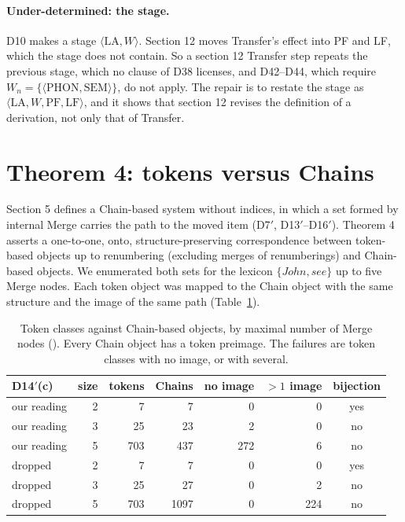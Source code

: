 \documentclass[11pt,a4paper]{article}
\newcommand{\code}[1]{\texttt{\detokenize{#1}}}
\begin{document}
\paragraph{Under-determined: the stage.} D10 makes a stage $\langle
\mathrm{LA}, W\rangle$. Section 12 moves Transfer's effect into PF and LF,
which the stage does not contain. So a section 12 Transfer step repeats the
previous stage, which no clause of D38 licenses, and D42--D44, which require
$W_n = \{\langle\mathrm{PHON},\mathrm{SEM}\rangle\}$, do not apply. The
repair is to restate the stage as $\langle \mathrm{LA}, W, \mathrm{PF},
\mathrm{LF}\rangle$, and it shows that section 12 revises the definition of
a derivation, not only that of Transfer.

\section{Theorem 4: tokens versus Chains}

Section 5 defines a Chain-based system without indices, in which a set formed
by internal Merge carries the path to the moved item (D7$'$,
D13$'$--D16$'$). Theorem 4 asserts a one-to-one, onto, structure-preserving
correspondence between token-based objects up to renumbering (excluding
merges of renumberings) and Chain-based objects. We enumerated both sets for
the lexicon $\{\mathit{John},\mathit{see}\}$ up to five Merge nodes. Each
token object was mapped to the Chain object with the same structure and the
image of the same path (Table~\ref{tab:t4}).

\begin{table}[htbp]
\centering
\footnotesize
\begin{tabular}{lrrrrrc}
\toprule
D14$'$(c) & size & tokens & Chains & no image & $>1$ image & bijection \\
\midrule
our reading & 2 &   7 &    7 &   0 &   0 & yes \\
our reading & 3 &  25 &   23 &   2 &   0 & no \\
our reading & 5 & 703 &  437 & 272 &   6 & no \\
dropped     & 2 &   7 &    7 &   0 &   0 & yes \\
dropped     & 3 &  25 &   27 &   0 &   2 & no \\
dropped     & 5 & 703 & 1097 &   0 & 224 & no \\
\bottomrule
\end{tabular}
\caption{Token classes against Chain-based objects, by maximal number of
Merge nodes (\code{theorem4_check.csv}). Every Chain object has a token
preimage. The failures are token classes with no image, or with several.}
\label{tab:t4}
\end{table}
\end{document}
